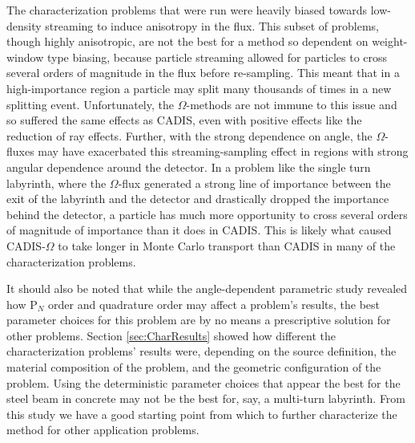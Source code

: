 The characterization problems that were run were heavily biased towards
low-density streaming to induce anisotropy in the flux. This subset of
problems, though highly anisotropic, are not the best
for a method so dependent on weight-window type biasing,
because particle streaming allowed for particles to cross several orders of
magnitude in the flux before re-sampling. This meant that in a high-importance
region a particle may split many thousands of times in a new splitting event.
Unfortunately, the $\Omega$-methods are not immune to this issue and so suffered
the same effects as CADIS, even with positive effects like the reduction of ray
effects. Further, with the strong dependence on angle, the $\Omega$-fluxes may
have exacerbated this streaming-sampling effect in regions with strong angular
dependence around the detector. In a problem like the single turn labyrinth,
where the $\Omega$-flux generated a strong line of importance between the exit
of the labyrinth and the detector and drastically dropped the importance behind
the detector, a particle has much more opportunity to cross several orders of
magnitude of importance than it does in CADIS. This is likely what caused
CADIS-$\Omega$ to take longer in Monte Carlo transport than CADIS in many of the
characterization problems.

It should also be noted that while the angle-dependent parametric study revealed
how P$_N$ order and quadrature order may affect a problem's results, the
best parameter choices for this problem are by no means a prescriptive solution
for other problems. Section \ref{sec:CharResults}
showed how different the characterization problems' results were, depending on
the source definition, the material composition of the problem, and the
geometric configuration of the problem. Using the deterministic parameter
choices that appear the best for the steel beam in concrete may not be the best
for, say, a multi-turn labyrinth. From this study we have a good starting point
from which to further characterize the method for other application problems.

